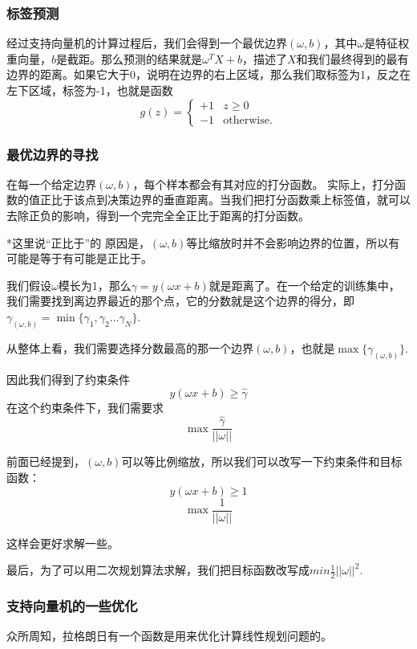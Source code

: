 \subsubsection{标签预测}
经过支持向量机的计算过程后，我们会得到一个最优边界$(\omega,b)$，其中$\omega$是特征权重向量，$b$是截距。那么预测的结果就是$\omega^TX+b$，描述了$X$和我们最终得到的最有边界的距离。如果它大于0，说明在边界的右上区域，那么我们取标签为1，反之在左下区域，标签为-1，也就是函数
\begin{equation}
 \nonumber
    g(z) =
\begin{cases}
    +1 & z \geq 0 \\
    -1 & \text{otherwise.}
\end{cases}
\end{equation}

\subsubsection{最优边界的寻找}
在每一个给定边界$(\omega,b)$，每个样本都会有其对应的打分函数。
实际上，打分函数的值正比于该点到决策边界的垂直距离。当我们把打分函数乘上标签值，就可以去除正负的影响，得到一个完完全全正比于距离的打分函数。

*这里说“正比于”的 原因是，$(\omega,b)$等比缩放时并不会影响边界的位置，所以有可能是等于有可能是正比于。

我们假设$\omega$模长为1，那么$\gamma= y(\omega x+b)$就是距离了。在一个给定的训练集中，我们需要找到离边界最近的那个点，它的分数就是这个边界的得分，即$\gamma_{(\omega,b)} = \min \{\gamma_1,\gamma_2\dots \gamma_N\}$.

从整体上看，我们需要选择分数最高的那一个边界$(\omega,b)$，也就是$\max \{\gamma_{(\omega,b)}\}$.

因此我们得到了约束条件
$$y(\omega x + b) \geq \hat \gamma$$
在这个约束条件下，我们需要求
$$\max \frac{\hat\gamma}{||\omega||}$$

前面已经提到，$(\omega,b)$可以等比例缩放，所以我们可以改写一下约束条件和目标函数：
$$y(\omega x + b) \geq 1$$
$$\max \frac{1}{||\omega||}$$

这样会更好求解一些。

最后，为了可以用二次规划算法求解，我们把目标函数改写成$min \frac{1}{2}||\omega||^2$.

\subsubsection{支持向量机的一些优化}
众所周知，拉格朗日有一个函数是用来优化计算线性规划问题的。

